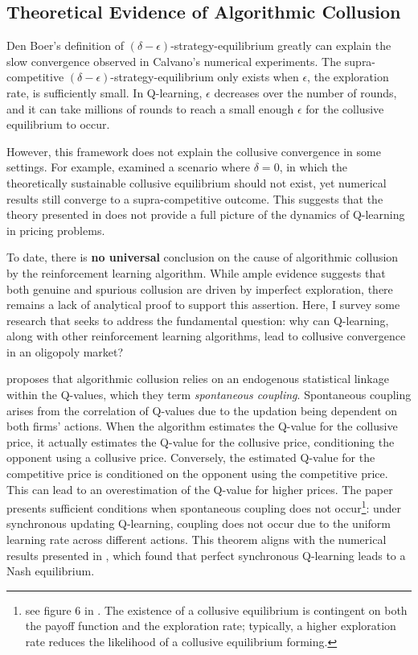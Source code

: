 \documentclass[mnsc,nonblindrev]{workingpaper}
\begin{document}
\subsection{Theoretical Evidence of Algorithmic Collusion}
\label{subsec:theoretical}

Den Boer's definition of $(\delta-\epsilon)$-strategy-equilibrium greatly can explain the slow convergence observed in Calvano's numerical experiments. The supra-competitive $(\delta-\epsilon)$-strategy-equilibrium only exists when $\epsilon$, the exploration rate, is sufficiently small. In Q-learning, $\epsilon$ decreases over the number of rounds, and it can take millions of rounds to reach a small enough $\epsilon$ for the collusive equilibrium to occur.

However, this framework does not explain the collusive convergence in some settings. For example, \cite{asker2023impact} examined a scenario where $\delta=0$, in which the theoretically sustainable collusive equilibrium should not exist, yet numerical results still converge to a supra-competitive outcome. This suggests that the theory presented in \cite{den2022artificial} does not provide a full picture of the dynamics of Q-learning in pricing problems.

To date, there is \textbf{no universal} conclusion on the cause of algorithmic collusion by the reinforcement learning algorithm. While ample evidence suggests that both genuine and spurious collusion are driven by imperfect exploration, there remains a lack of analytical proof to support this assertion. Here, I survey some research that seeks to address the fundamental question: why can Q-learning, along with other reinforcement learning algorithms, lead to collusive convergence in an oligopoly market?

\cite{banchioartificial} proposes that algorithmic collusion relies on an endogenous statistical linkage within the Q-values, which they term \textit{spontaneous coupling}. Spontaneous coupling arises from the correlation of Q-values due to the updation being dependent on both firms' actions. When the algorithm estimates the Q-value for the collusive price, it actually estimates the Q-value for the collusive price, conditioning the opponent using a collusive price. Conversely, the estimated Q-value for the competitive price is conditioned on the opponent using the competitive price. This can lead to an overestimation of the Q-value for higher prices. The paper presents sufficient conditions when spontaneous coupling does not occur\footnote{see figure 6 in \cite{banchio2022artificial}. The existence of a collusive equilibrium is contingent on both the payoff function and the exploration rate; typically, a higher exploration rate reduces the likelihood of a collusive equilibrium forming.}: under synchronous updating Q-learning, coupling does not occur due to the uniform learning rate across different actions. This theorem aligns with the numerical results presented in \cite{asker2022artificial}, which found that perfect synchronous Q-learning leads to a Nash equilibrium.
\end{document}
